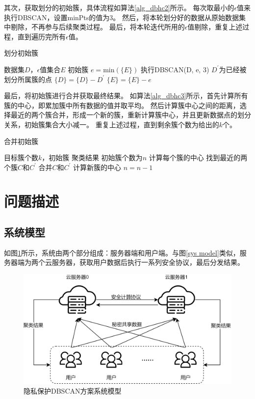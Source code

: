 其次，获取划分的初始簇，具体流程如算法\ref{alg_dbhc2}所示。
每次取最小的$\epsilon$值来执行DBSCAN，设置minPts的值为3。
然后，将本轮划分好的数据从原始数据集中剔除，不再参与后续聚类过程。
最后，将本轮迭代所用的$\epsilon$值剔除，重复上述过程，直到遍历完所有$\epsilon$值。
\begin{algorithm}[htbp]
	\renewcommand{\algorithmicrequire}{\textbf{输入:}}
	\renewcommand{\algorithmicensure}{\textbf{输出:}}
	\caption{划分初始簇}
	\label{alg_dbhc2}
	\begin{algorithmic}[1]
		\REQUIRE 数据集$ D $，$\epsilon$值集合$ E $
		\ENSURE 初始簇
		\STATE $ e = \text{min}(\{E\}) $
		\STATE 执行DBSCAN(D, e, 3)
		\STATE $ D^{\prime} $为已经被划分所属簇的点
		\STATE $ \{D\} = \{D\} - D^{\prime} $
		\STATE $ \{E\} = \{E\} - e $
		\ENDWHILE
	\end{algorithmic}
\end{algorithm}

最后，将初始簇进行合并获取最终结果。
如算法\ref{alg_dbhc3}所示，首先计算所有簇的中心，即累加簇中所有数据的值并取平均。
然后计算簇中心之间的距离，选择最近的两个簇合并，形成一个新的簇，重新计算簇中心，并且更新数据点的划分关系，初始簇集合大小减一。
重复上述过程，直到剩余簇个数为给出的$ k $个。

\begin{algorithm}[htbp]
	\renewcommand{\algorithmicrequire}{\textbf{输入:}}
	\renewcommand{\algorithmicensure}{\textbf{输出:}}
	\caption{合并初始簇}
	\label{alg_dbhc3}
	\begin{algorithmic}[1]
		\REQUIRE 目标簇个数$ k $，初始簇
		\ENSURE 聚类结果
		\STATE 初始簇个数为$ n $
		\STATE 计算每个簇的中心
		\STATE 找到最近的两个簇$ C $和$ C^{\prime} $
		\STATE 合并$ C $和$ C^{\prime} $
		\STATE 计算新簇的中心
		\STATE $ n = n-1 $
		\ENDWHILE
	\end{algorithmic}
\end{algorithm}
\section{问题描述}
\label{s4-wenti}
\subsection{系统模型}
如图\ref{s4-sysmod}所示，系统由两个部分组成：服务器端和用户端。与图\ref{sys model}类似，服务器端为两个云服务器，获取用户数据后执行一系列安全协议，最后分发结果。
\begin{figure}[htbp]
	\centering
	\includegraphics[width=0.7\linewidth]{img/sysmodel2.png}%
	\caption{隐私保护DBSCAN方案系统模型}
	\label{s4-sysmod}
\end{figure}

